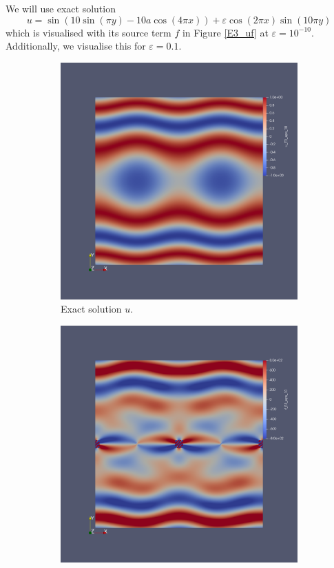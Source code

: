 \documentclass[12pt,a4paper]{article}
\begin{document}
We will use exact solution
\begin{equation}
u = \sin(10\sin(\pi y)-10a\cos(4 \pi x)) + \varepsilon \cos(2 \pi x)\sin(10 \pi y)
\end{equation}
which is visualised with its source term $f$ in Figure \ref{E3_uf} at $\varepsilon = 10^{-10}$. Additionally, we visualise this for $\varepsilon = 0.1$.
\begin{figure}[H]
 \begin{subfigure}{0.5\textwidth}
     \includegraphics[width=\textwidth]{Pics/uf/U_E3_eps_10.png}
     \caption{Exact solution $u$.}
 \end{subfigure}
   \begin{subfigure}{0.5\textwidth}
     \includegraphics[width=\textwidth]{Pics/uf/F_E3_eps_10.png}

\end{subfigure}
\end{figure}
\end{document}
